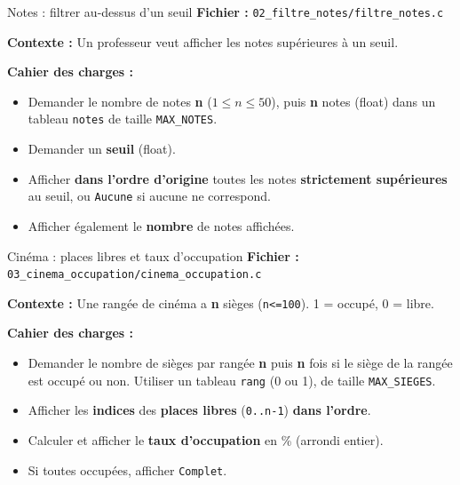 \begin{UPSTIManipulation}{Notes : filtrer au-dessus d'un seuil}
  \textbf{Fichier :} \texttt{02\_filtre\_notes/filtre\_notes.c}

  \textbf{Contexte :} Un professeur veut afficher les notes supérieures à un seuil.

  \textbf{Cahier des charges :}
  \begin{itemize}
    \item Demander le nombre de notes \textbf{n} ($1\le n \le 50$), puis \textbf{n} notes (float) dans un tableau \texttt{notes} de taille \texttt{MAX\_NOTES}.
    \item Demander un \textbf{seuil} (float).
    \item Afficher \textbf{dans l'ordre d'origine} toutes les notes \textbf{strictement supérieures} au seuil,
          ou \texttt{Aucune} si aucune ne correspond.
    \item Afficher également le \textbf{nombre} de notes affichées.
  \end{itemize}

\end{UPSTIManipulation}


\begin{UPSTIManipulation}{Cinéma : places libres et taux d'occupation}
  \textbf{Fichier :} \texttt{03\_cinema\_occupation/cinema\_occupation.c}

  \textbf{Contexte :} Une rangée de cinéma a \textbf{n} sièges (\texttt{n<=100}). 1 = occupé, 0 = libre.

  \textbf{Cahier des charges :}
  \begin{itemize}
    \item Demander le nombre de sièges par rangée \textbf{n} puis \textbf{n} fois si le siège de la rangée est occupé ou non. Utiliser un tableau \texttt{rang} (0 ou 1), de taille \texttt{MAX\_SIEGES}.
    \item Afficher les \textbf{indices} des \textbf{places libres} (\texttt{0..n-1}) \textbf{dans l'ordre}.
    \item Calculer et afficher le \textbf{taux d'occupation} en \% (arrondi entier).
    \item Si toutes occupées, afficher \texttt{Complet}.
  \end{itemize}


\end{UPSTIManipulation}


